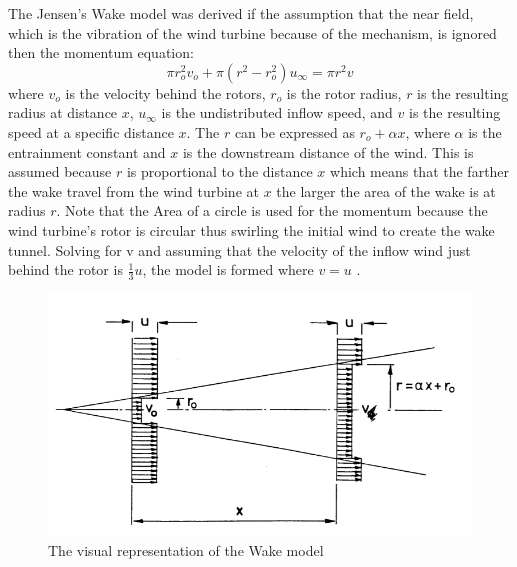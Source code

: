     The Jensen's Wake model was derived if the assumption that the near field, which is the vibration of the wind turbine because of the mechanism, is ignored then the momentum equation:
        \begin{equation}
            \pi r_{o}^{2} v_{o} + \pi (r^{2} - r_{o}^{2})u_{\infty} = \pi r^{2} v
        \end{equation}
    where $v_{o}$ is the velocity behind the rotors, $r_{o}$ is the rotor radius, $r$ is the resulting radius at distance $x$, $u_{\infty}$ is the undistributed inflow speed, and $v$ is the resulting speed at a specific distance $x$. The $r$ can be expressed as $r_{o} + \alpha x$, where $\alpha$ is the entrainment constant and $x$ is the downstream distance of the wind. This is assumed because $r$ is  proportional to the distance $x$ which means that the farther the wake travel from the wind turbine at $x$ the larger the area of the wake is at radius $r$. Note that the Area of a circle is used for the momentum because the wind turbine's rotor is circular thus swirling the initial wind to create the wake tunnel. Solving for v and assuming that the velocity of the inflow wind just behind the rotor is $\frac{1}{3} u$, the model is formed where $v = u$ \cite{book2}.
        \begin{figure}
            \centering
            \includegraphics{Figures/wakemodeJensen.PNG}
            \caption{The visual representation of the Wake model\cite{book2}}
            \label{fig:my_label}
        \end{figure}
    
